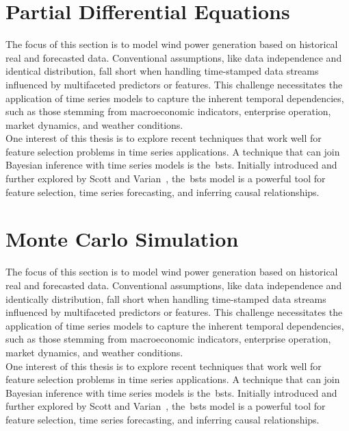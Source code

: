 \section{Partial Differential Equations}
    \label{sec:pde}

    The focus of this section is to model wind power generation based on historical real and forecasted data.
    Conventional assumptions, like data independence and identical distribution, fall short when handling time-stamped
    data streams influenced by multifaceted predictors or features.
    This challenge necessitates the application of time series models to capture the inherent temporal dependencies,
    such as those stemming from macroeconomic indicators, enterprise operation, market dynamics, and weather conditions.\\

    One interest of this thesis is to explore recent techniques that work well for feature selection problems in
    time series applications.
    A technique that can join Bayesian inference with time series models is the~\gls{bsts}.
    Initially introduced and further explored by Scott and Varian~\cite{scott_predicting_2013, scott_bayesian_2013},
    the~\gls{bsts} model is a powerful tool for feature selection,
time series forecasting, and inferring causal relationships. \\


\section{Monte Carlo Simulation}
    \label{sec:mc_sim}

    The focus of this section is to model wind power generation based on historical real and forecasted data.
    Conventional assumptions, like data independence and identically distribution, fall short when handling time-stamped
    data streams influenced by multifaceted predictors or features.
    This challenge necessitates the application of time series models to capture the inherent temporal dependencies,
    such as those stemming from macroeconomic indicators, enterprise operation, market dynamics, and weather conditions.\\

    One interest of this thesis is to explore recent techniques that work well for feature selection problems in
    time series applications.
    A technique that can join Bayesian inference with time series models is the~\gls{bsts}.
    Initially introduced and further explored by Scott and Varian~\cite{scott_predicting_2013, scott_bayesian_2013},
    the~\gls{bsts} model is a powerful tool for feature selection,
time series forecasting, and inferring causal relationships. \\


